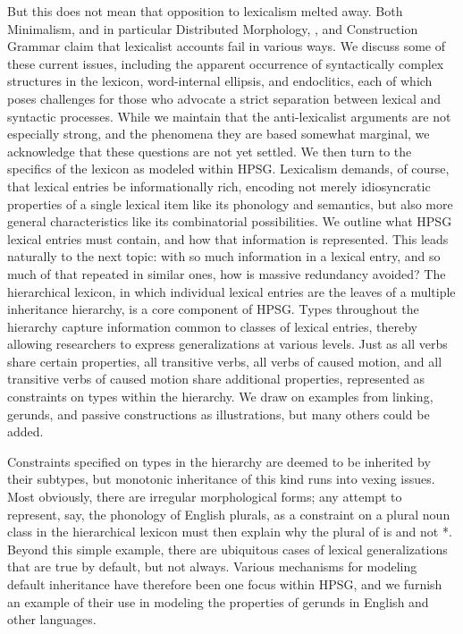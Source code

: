 \documentclass[output=paper]{langsci/langscibook}
\begin{document}
But this does not mean that opposition to lexicalism melted away.  Both Minimalism, and in particular Distributed Morphology, \citep{Bruening2018, Marantz1997}, and Construction Grammar \citep{Goldberg1995,Tomasello2003,vanTrijp2011} claim that lexicalist accounts fail in various ways.  We discuss some of these current issues, including the apparent occurrence of syntactically complex structures in the lexicon, word-internal ellipsis,  and endoclitics, each of which poses challenges for those who advocate a strict separation between lexical and syntactic processes.  While we maintain that the anti-lexicalist arguments are not especially strong, and the phenomena they are based somewhat marginal, we acknowledge that these questions are not yet settled. We then turn to the specifics of the lexicon as modeled within HPSG.  Lexicalism demands, of course, that lexical entries be informationally rich, encoding not merely idiosyncratic properties of a single lexical item like its phonology and semantics, but also more general characteristics like its combinatorial possibilities.  We outline what HPSG lexical entries must contain, and how that information is represented.  This leads naturally to the next topic: with so much information in a lexical entry, and so much of that repeated in similar ones, how is massive redundancy avoided?  The hierarchical lexicon, in which individual lexical entries are the leaves of a multiple inheritance hierarchy, is a core component of HPSG.  Types throughout the hierarchy capture information common to classes of lexical entries, thereby allowing researchers to express generalizations at various levels.  Just as all verbs share certain properties, all transitive verbs, all verbs of caused motion, and all transitive verbs of caused motion share additional properties, represented as constraints on types within the hierarchy.  We draw on examples from linking, gerunds, and passive constructions as illustrations, but many others could be added.

Constraints specified on types in the hierarchy are deemed to be inherited by their subtypes, but monotonic inheritance of this kind runs into vexing issues.  Most obviously, there are irregular morphological forms; any attempt to represent, say, the phonology of English plurals, as a constraint on a plural noun class in the hierarchical lexicon must then explain why the plural of  is  and not *.  Beyond this simple example, there are ubiquitous cases of lexical generalizations that are true by default, but not always.  Various mechanisms for modeling default inheritance have therefore been one focus within HPSG, and we furnish an example of their use in modeling the properties of gerunds in English and other languages.
\end{document}
